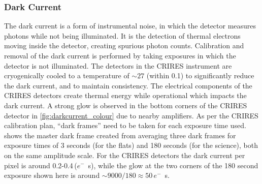 \subsubsection{Dark Current}
\label{subsubsec:darkcurrent}
The dark current is a form of instrumental noise, in which the detector measures photons while not being illuminated.
It is the detection of thermal electrons moving inside the detector, creating spurious photon counts.
Calibration and removal of the dark current is performed by taking exposures in which the detector is not illuminated.
The detectors in the {CRIRES} instrument are cryogenically cooled to a temperature of \(\sim 27\)\K{} (within 0.1\K{}) to significantly reduce the dark current, and to maintain consistency.
The electrical components of the {CRIRES} detectors create thermal energy while operational which impacts the dark current.
A strong glow is observed in the bottom corners of the {CRIRES} detector in \cref{fig:darkcurrent_colour} due to nearby amplifiers.
As per the {CRIRES} calibration plan, ``dark frames'' need to be taken for each exposure time used.  shows the master dark frame created from averaging three dark frames for exposure times of 3 seconds (for the flats) and 180 seconds (for the science), both on the same amplitude scale.
For the {CRIRES} detectors the dark current per pixel is around 0.2-0.4\,(\(e^{-}\)\si{\per\second}), while the glow at the two corners of the 180 second exposure shown here is around \(\sim9000 / 180\approx50\)\,\(e^{-}\)\si{\per\second}.

%


